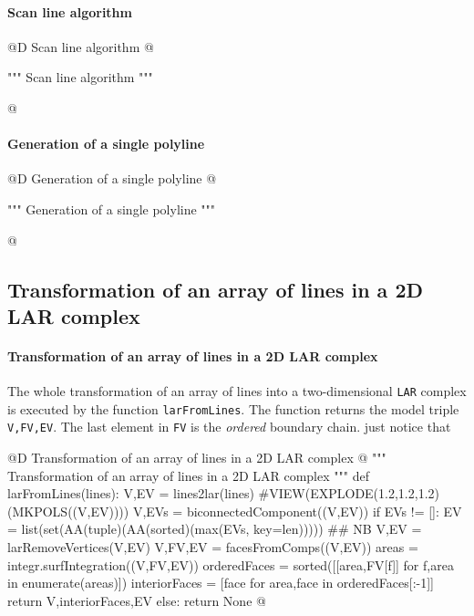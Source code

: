 \documentclass[11pt,oneside]{article}    %
\begin{document}
\paragraph{Scan line algorithm}
@D Scan line algorithm 
@{""" Scan line algorithm """

@}


\paragraph{Generation of a single polyline}
@D Generation of a single polyline 
@{""" Generation of a single polyline """

@}



\subsection{Transformation of an array of lines in a 2D LAR complex}

\paragraph{Transformation of an array of lines in a 2D LAR complex}

The whole transformation of an array of lines into a two-dimensional \texttt{LAR} complex is executed by the function \texttt{larFromLines}. The function returns the model triple \texttt{V,FV,EV}. The last element in \texttt{FV} is the \emph{ordered} boundary chain. just notice that 


@D Transformation of an array of lines in a 2D LAR complex @{
""" Transformation of an array of lines in a 2D LAR complex """
def larFromLines(lines):
    V,EV = lines2lar(lines)
    #VIEW(EXPLODE(1.2,1.2,1.2)(MKPOLS((V,EV))))
    V,EVs = biconnectedComponent((V,EV))
    if EVs != []:
        EV = list(set(AA(tuple)(AA(sorted)(max(EVs, key=len)))))  ## NB
        V,EV = larRemoveVertices(V,EV)
        V,FV,EV = facesFromComps((V,EV))
        areas = integr.surfIntegration((V,FV,EV))
        orderedFaces = sorted([[area,FV[f]] for f,area in enumerate(areas)])
        interiorFaces = [face for area,face in orderedFaces[:-1]]
        return V,interiorFaces,EV
    else: return None
@}
\end{document}
